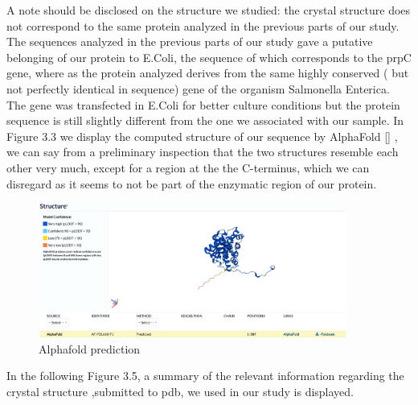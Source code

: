 \documentclass[a4paper,english,12pt,bibliography=totoc]{scrreprt}
\begin{document}
A note should be disclosed on the structure we studied: the crystal structure does not correspond to the same protein analyzed in the previous parts of our study.
The sequences analyzed in the previous parts of our study gave a putative belonging of our protein to E.Coli, the sequence of which corresponds to the prpC gene, where as the protein analyzed derives from the same highly conserved ( but not perfectly identical in sequence)  gene of the organism Salmonella Enterica.
The gene was transfected in E.Coli for better culture conditions but the protein sequence is still slightly different from the one we associated with our sample.
In Figure  3.3 we display the computed structure of our sequence by AlphaFold [\cite{jumper_highly_2021}] , we can say from a preliminary inspection that the two structures resemble each other very much, except for a region at the the C-terminus, which we can disregard as it seems to not be part of the enzymatic region of our protein.
\begin{figure}[H]
        \centering
        \includegraphics[width=0.9\textwidth]{Project 3/alphafold.png}
	    \caption{Alphafold prediction}
\end{figure}

In the following Figure 3.5, a summary of the relevant information regarding the crystal structure ,submitted to pdb, we used in our study is displayed.
\end{document}
